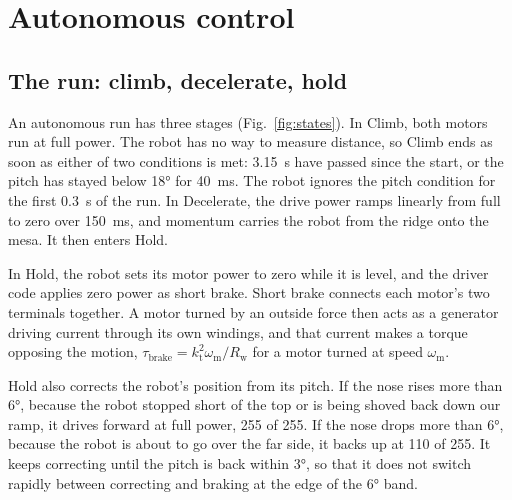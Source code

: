 \section{Autonomous control}
\label{sec:control}

\subsection{The run: climb, decelerate, hold}
\label{sec:run}

An autonomous run has three stages (Fig.~\ref{fig:states}). In Climb, both motors run at full power. The robot has no way to measure distance, so Climb ends as soon as either of two conditions is met: \qty{3.15}{s} have passed since the start, or the pitch has stayed below \ang{18} for \qty{40}{ms}. The robot ignores the pitch condition for the first \qty{0.3}{s} of the run. In Decelerate, the drive power ramps linearly from full to zero over \qty{150}{ms}, and momentum carries the robot from the ridge onto the mesa. It then enters Hold.

In Hold, the robot sets its motor power to zero while it is level, and the driver code applies zero power as short brake. Short brake connects each motor's two terminals together. A motor turned by an outside force then acts as a generator driving current through its own windings, and that current makes a torque opposing the motion, $\tau_\mathrm{brake} = k_\mathrm{t}^2 \omega_\mathrm{m} / R_\mathrm{w}$ for a motor turned at speed $\omega_\mathrm{m}$.

Hold also corrects the robot's position from its pitch. If the nose rises more than \ang{6}, because the robot stopped short of the top or is being shoved back down our ramp, it drives forward at full power, 255 of 255. If the nose drops more than \ang{6}, because the robot is about to go over the far side, it backs up at 110 of 255. It keeps correcting until the pitch is back within \ang{3}, so that it does not switch rapidly between correcting and braking at the edge of the \ang{6} band.

